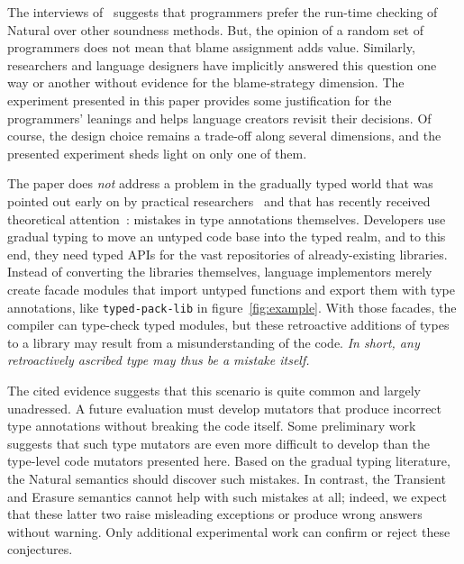 
The interviews of~\citet{tgpk-dls-2018} suggests that programmers
prefer the run-time checking of Natural over other soundness methods. But,
the opinion of a random set of programmers does not mean that blame
assignment adds value. Similarly, researchers and language designers have
implicitly answered this question one way or another without evidence for the
blame-strategy dimension. The experiment presented in this paper provides some
justification for the programmers' leanings
 
and helps language creators revisit
their decisions. Of course, the design choice remains a trade-off
along several dimensions, and  the presented experiment sheds light on
only one of them. 

The paper does {\em not\/} address a problem in the gradually typed world that
was pointed out early on by practical researchers~\citep{incorrect-ts,
sta-nt-base-types, wmwz-ecoop-2017} and that has recently received theoretical
attention~\citep{gfd-oopsla-2019, cc-oopsla-20}: mistakes in type annotations
themselves.  Developers use gradual typing to move an untyped code base into the
typed realm, and to this end, they need typed APIs for the vast repositories of
already-existing libraries. Instead of converting the libraries themselves,
language implementors merely create facade modules that import untyped functions
and export them with type annotations, like {\tt typed-pack-lib} in
figure~\ref{fig:example}.  With those facades, the compiler can 
type-check typed modules, but these retroactive additions of types to a library
may result from a misunderstanding of the code. \emph{In short, any retroactively ascribed
type may thus be a mistake itself.}

The cited evidence suggests that this scenario is quite common and largely
unadressed.  A future evaluation must develop mutators that produce incorrect
type annotations without breaking the code itself. Some preliminary work
suggests that such type mutators are even more difficult to develop than the
type-level code mutators presented here. Based on the gradual typing literature,
the Natural semantics should discover such mistakes. In contrast, the Transient
and Erasure semantics cannot help with such mistakes at all; indeed, we expect
that these latter two raise misleading exceptions or produce wrong answers
without warning.  Only additional experimental work can confirm or reject these
conjectures.



